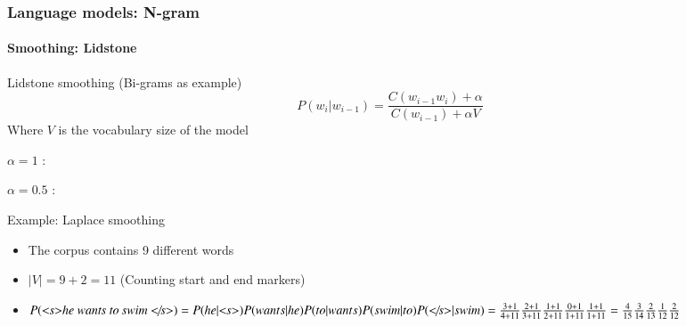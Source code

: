 \documentclass[xcolor=table]{beamer}
\begin{document}
\begin{frame}
\frametitle{Language models: N-gram}
\framesubtitle{Smoothing: Lidstone}

\begin{block}{Lidstone smoothing (Bi-grams as example)}
	\[%
	P(w_i | w_{i-1}) = \frac{C(w_{i-1} w_i) + \alpha}{C(w_{i-1}) + \alpha V}
	\]
	Where $V$ is the vocabulary size of the model
	
	$\alpha = 1$ :  
	
	$\alpha = 0.5$ : 
\end{block}

\begin{exampleblock}{Example: Laplace smoothing}
	\begin{itemize}
		\item The corpus contains 9 different words
		\item $|V| = 9 + 2 = 11$ (Counting start and end markers)
		\item $P(\text{\textit{\textless s\textgreater he wants to swim \textless/s\textgreater}}) = 
		P(he|\text{\textit{\textless s\textgreater}}) P(wants|he) P(to|wants) P(swim|to) P(\text{\textit{\textless/s\textgreater}}|swim) = 
		\frac{3 + 1}{4 + 11} \frac{2 + 1}{3 + 11} \frac{1 + 1}{2 + 11} \frac{0 + 1}{1 + 11} \frac{1 + 1}{1 + 11}
		= \frac{4}{15} \frac{3}{14} \frac{2}{13} \frac{1}{12} \frac{2}{12} $
	\end{itemize}
\end{exampleblock}

\end{frame}
\end{document}
